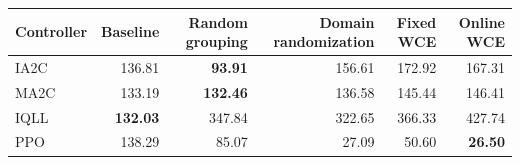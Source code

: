 \begin{tabular}{lrrrrr}
\hline
Controller & Baseline & Random grouping & Domain randomization & Fixed WCE & Online WCE \\
\hline
IA2C & 136.81 & \textbf{93.91} & 156.61 & 172.92 & 167.31 \\
MA2C & 133.19 & \textbf{132.46} & 136.58 & 145.44 & 146.41 \\
IQLL & \textbf{132.03} & 347.84 & 322.65 & 366.33 & 427.74 \\
PPO & 138.29 & 85.07 & 27.09 & 50.60 & \textbf{26.50} \\
\hline
\end{tabular}
